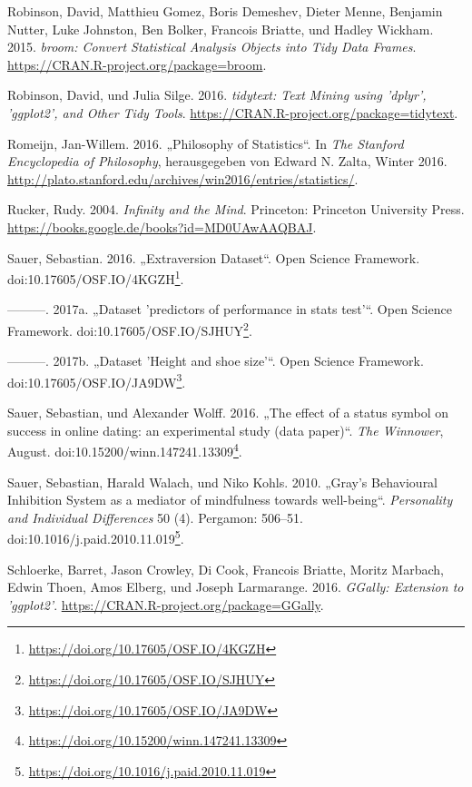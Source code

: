 \documentclass[12pt,ngerman,]{book}
\let\rmarkdownfootnote\footnote%
\def\footnote{\protect\rmarkdownfootnote}
\renewcommand{\href}[2]{#2\footnote{\url{#1}}}
\theoremstyle{definition}
\theoremstyle{definition}
\theoremstyle{remark}
\begin{document}
\hypertarget{ref-R-broom}{}
Robinson, David, Matthieu Gomez, Boris Demeshev, Dieter Menne, Benjamin
Nutter, Luke Johnston, Ben Bolker, Francois Briatte, und Hadley Wickham.
2015. \emph{broom: Convert Statistical Analysis Objects into Tidy Data
Frames}. \url{https://CRAN.R-project.org/package=broom}.

\hypertarget{ref-R-tidytext}{}
Robinson, David, und Julia Silge. 2016. \emph{tidytext: Text Mining
using 'dplyr', 'ggplot2', and Other Tidy Tools}.
\url{https://CRAN.R-project.org/package=tidytext}.

\hypertarget{ref-sep-statistics}{}
Romeijn, Jan-Willem. 2016. „Philosophy of Statistics``. In \emph{The
Stanford Encyclopedia of Philosophy}, herausgegeben von Edward N. Zalta,
Winter 2016.
\url{http://plato.stanford.edu/archives/win2016/entries/statistics/}.

\hypertarget{ref-ruckerinfinity}{}
Rucker, Rudy. 2004. \emph{Infinity and the Mind}. Princeton: Princeton
University Press. \url{https://books.google.de/books?id=MD0UAwAAQBAJ}.

\hypertarget{ref-Sauer_2016}{}
Sauer, Sebastian. 2016. „Extraversion Dataset``. Open Science Framework.
doi:\href{https://doi.org/10.17605/OSF.IO/4KGZH}{10.17605/OSF.IO/4KGZH}.

\hypertarget{ref-Sauer_2017}{}
---------. 2017a. „Dataset 'predictors of performance in stats test'``.
Open Science Framework.
doi:\href{https://doi.org/10.17605/OSF.IO/SJHUY}{10.17605/OSF.IO/SJHUY}.

\hypertarget{ref-Sauer_2017a}{}
---------. 2017b. „Dataset 'Height and shoe size'``. Open Science
Framework.
doi:\href{https://doi.org/10.17605/OSF.IO/JA9DW}{10.17605/OSF.IO/JA9DW}.

\hypertarget{ref-sauer_wolff}{}
Sauer, Sebastian, und Alexander Wolff. 2016. „The effect of a status
symbol on success in online dating: an experimental study (data
paper)``. \emph{The Winnower}, August.
doi:\href{https://doi.org/10.15200/winn.147241.13309}{10.15200/winn.147241.13309}.

\hypertarget{ref-sauer2010gray}{}
Sauer, Sebastian, Harald Walach, und Niko Kohls. 2010. „Gray's
Behavioural Inhibition System as a mediator of mindfulness towards
well-being``. \emph{Personality and Individual Differences} 50 (4).
Pergamon: 506--51.
doi:\href{https://doi.org/10.1016/j.paid.2010.11.019}{10.1016/j.paid.2010.11.019}.

\hypertarget{ref-R-GGally}{}
Schloerke, Barret, Jason Crowley, Di Cook, Francois Briatte, Moritz
Marbach, Edwin Thoen, Amos Elberg, und Joseph Larmarange. 2016.
\emph{GGally: Extension to 'ggplot2'}.
\url{https://CRAN.R-project.org/package=GGally}.
\end{document}
